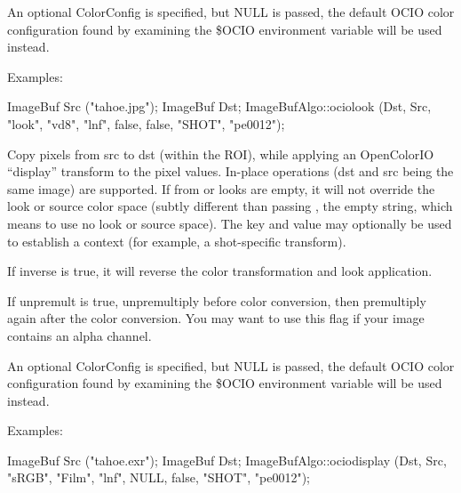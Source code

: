 An optional {\cf ColorConfig} is specified, but {\cf NULL} is passed, the
default OCIO color configuration found by examining the {\cf \$OCIO}
environment variable will be used instead.

\smallskip
\noindent Examples:
\begin{code}
    ImageBuf Src ("tahoe.jpg");
    ImageBuf Dst;
    ImageBufAlgo::ociolook (Dst, Src, "look", "vd8", "lnf", false, false,
                            "SHOT", "pe0012");
\end{code}
\apiend


 
Copy pixels from {\cf src} to {\cf dst} (within the ROI), while
applying an OpenColorIO ``display'' transform to the pixel values.
In-place operations ({\cf dst} and {\cf src} being the same image)
are supported.  If {\cf from} or {\cf looks} are empty, it will not
override the look or source color space (subtly different than
passing \qkw{}, the empty string, which means to use no look or source
space).  The {\cf key} and {\cf value} may optionally be used
to establish a context (for example, a shot-specific transform).

If {\cf inverse} is {\cf true}, it will reverse the color transformation
and look application.

If {\cf unpremult} is {\cf true}, unpremultiply before color conversion,
then premultiply again after the color conversion.  You may want to use
this flag if your image contains an alpha channel.

An optional {\cf ColorConfig} is specified, but {\cf NULL} is passed, the
default OCIO color configuration found by examining the {\cf \$OCIO}
environment variable will be used instead.

\smallskip
\noindent Examples:
\begin{code}
    ImageBuf Src ("tahoe.exr");
    ImageBuf Dst;
    ImageBufAlgo::ociodisplay (Dst, Src, "sRGB", "Film", "lnf", NULL,
                               false, "SHOT", "pe0012");
\end{code}
\apiend


